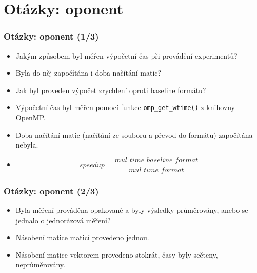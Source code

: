 \documentclass{beamer}
\newcommand{\backupbegin}{
   \newcounter{finalframe}
   \setcounter{finalframe}{\value{framenumber}}
}
\begin{document}



\backupbegin

\section{Otázky: oponent}
\begin{frame}
	\frametitle{Otázky: oponent (1/3)}
	\begin{exampleblock}{}
		\begin{itemize}
			\item Jakým způsobem byl měřen výpočetní čas při provádění experimentů?
			\item Byla do něj započítána i doba načítání matic?
			\item Jak byl proveden výpočet zrychlení oproti baseline formátu?
		\end{itemize}
	\end{exampleblock}
	\begin{alertblock}{}
	   \begin{itemize}
			\item Výpočetní čas byl měřen pomocí funkce \texttt{omp\_get\_wtime()} z knihovny OpenMP.
			\item Doba načítání matic (načítání ze souboru a převod do formátu) započítána nebyla.
			\item $$ speedup = \frac{mul\_time\_baseline\_format}{mul\_time\_format} $$
		\end{itemize}
	\end{alertblock}	
\end{frame}
\begin{frame}
	\frametitle{Otázky: oponent (2/3)}
	\begin{exampleblock}{}
		\begin{itemize}
			\item Byla měření prováděna opakovaně a byly výsledky průměrovány, anebo se jednalo o jednorázová měření?
		\end{itemize}
	\end{exampleblock}
	\begin{alertblock}{}
	   \begin{itemize}
			\item Násobení matice maticí provedeno jednou.
			\item Násobení matice vektorem provedeno stokrát, časy byly sečteny, neprůměrovány.
		\end{itemize}
	\end{alertblock}	
\end{frame}
\end{document}
